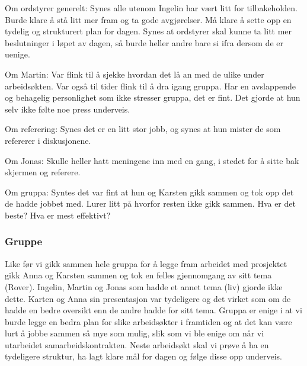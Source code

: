 \documentclass[5p]{elsarticle}
\begin{document}
Om ordstyrer generelt: Synes alle utenom Ingelin har vært litt for tilbakeholden. Burde klare å stå litt mer fram og ta gode avgjørelser. Må klare å sette opp en tydelig og strukturert plan for dagen. Synes at ordstyrer skal kunne ta litt mer beslutninger i løpet av dagen, så burde heller andre bare si ifra dersom de er uenige.

Om Martin: Var flink til å sjekke hvordan det lå an med de ulike under arbeidsøkten. Var også til tider flink til å dra igang gruppa. Har en avslappende og behagelig personlighet som ikke stresser gruppa, det er fint. Det gjorde at hun selv ikke følte noe press underveis.

Om referering: Synes det er en litt stor jobb, og synes at hun mister de som refererer i diskusjonene.

Om Jonas: Skulle heller hatt meningene inn med en gang, i stedet for å sitte bak skjermen og referere.

Om gruppa: Syntes det var fint at hun og Karsten gikk sammen og tok opp det de hadde jobbet med. Lurer litt på hvorfor resten ikke gikk sammen. Hva er det beste? Hva er mest effektivt?

\subsubsection*{Gruppe}
Like før vi gikk sammen hele gruppa for å legge fram arbeidet med prosjektet gikk Anna og Karsten sammen og tok en felles gjennomgang av sitt tema (Rover). Ingelin, Martin og Jonas som hadde et annet tema (liv) gjorde ikke dette. Karten og Anna sin presentasjon var tydeligere og det virket som om de hadde en bedre oversikt enn de andre hadde for sitt tema. Gruppa er enige i at vi burde legge en bedra plan for slike arbeidsøkter i framtiden og at det kan være lurt å jobbe sammen så mye som mulig, slik som vi ble enige om når vi utarbeidet samarbeidskontrakten. Neste arbeidsøkt skal vi prøve å ha en tydeligere struktur, ha lagt klare mål for dagen og følge disse opp underveis.
\end{document}
